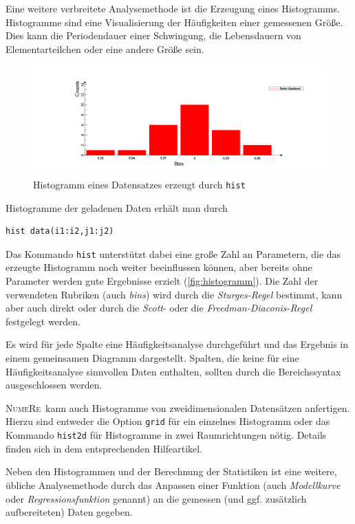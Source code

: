 \documentclass[DIV=14,headsepline,footsepline]{scrbook}
\newcommand{\NR}{\textsc{Nu\-me\-Re}}
\begin{document}
				Eine weitere verbreitete Analysemethode ist die Erzeugung eines Histogramms. Histogramme sind eine Visualisierung der Häufigkeiten einer gemessenen Größe. Dies kann die Periodendauer einer Schwingung, die Lebensdauern von Elementarteilchen oder eine andere Größe sein.
				\begin{figure}[htb]%
					\centering
					\includegraphics[width=\textwidth]{_graphics/histogramm.png}
					\caption{Histogramm eines Datensatzes erzeugt durch \texttt{hist}}
					\label{fig:histogramm}
				\end{figure}
				
				Histogramme der geladenen Daten erhält man durch 
				\begin{lstlisting}
hist data(i1:i2,j1:j2)
				\end{lstlisting}
				Das Kommando \verb+hist+ unterstützt dabei eine große Zahl an Parametern, die das erzeugte Histogramm noch weiter beeinflussen können, aber bereits ohne Parameter werden gute Ergebnisse erzielt (\autoref{fig:histogramm}). Die Zahl der verwendeten Rubriken (auch \emph{bins}) wird durch die \emph{Sturges-Regel} bestimmt, kann aber auch direkt oder durch die \emph{Scott}- oder die \emph{Freedman-Diaconis-Regel} festgelegt werden.
				
				Es wird für jede Spalte eine Häufigkeitsanalyse durchgeführt und das Ergebnis in einem gemeinsamen Diagramm dargestellt. Spalten, die keine für eine Häufigkeitsanalyse sinnvollen Daten enthalten, sollten durch die Bereichssyntax ausgeschlossen werden.
				
				\NR\ kann auch Histogramme von zweidimensionalen Datensätzen anfertigen. Hierzu sind entweder die Option \verb+grid+ für ein einzelnes Histogramm oder das Kommando \verb+hist2d+ für Histogramme in zwei Raumrichtungen nötig. Details finden sich in dem entsprechenden Hilfeartikel.
				
				Neben den Histogrammen und der Berechnung der Statistiken ist eine weitere, übliche Analysemethode durch das Anpassen einer Funktion (auch \emph{Modellkurve} oder \emph{Regressionsfunktion} genannt) an die gemessen (und ggf. zusätzlich aufbereiteten) Daten gegeben.
				
\end{document}
